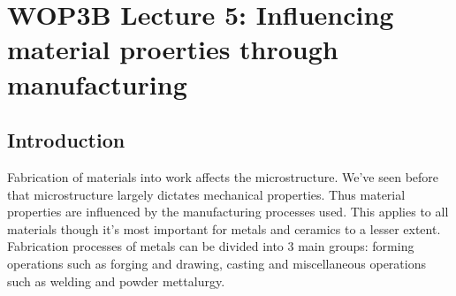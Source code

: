 \documentclass[11pt, a4paper]{article}
\begin{document}
\setcounter{section}{4}
\setcounter{equation}{0}

\section{WOP3B Lecture 5: Influencing material proerties through manufacturing}

\subsection{Introduction}
Fabrication of materials into work affects the microstructure. We've seen before that microstructure largely dictates mechanical properties. Thus material properties are influenced by the manufacturing processes used. This applies to all materials though it's most important for metals and ceramics to a lesser extent. Fabrication processes of metals can be divided into $3$ main groups: forming operations such as forging and drawing, casting and miscellaneous operations such as welding and powder mettalurgy.
\end{document}
